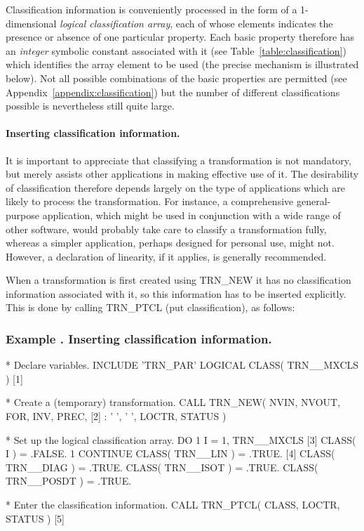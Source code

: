 \documentclass[twoside,nolof,11pt]{starlink}
\providecommand{\name}[1]{\small{#1}}
\newcounter{examplecounter}
\providecommand{\example}[1]{\addtocounter{examplecounter}{1}
                         \subsubsection*{Example \theexamplecounter. #1}}
\begin{document}
Classification information is conveniently processed in the form of a
1-dimensional \emph{logical classification array}, each of whose elements
indicates the presence or absence of one particular property.
Each basic property therefore has an \emph{integer} symbolic constant
associated with it (see Table~\ref{table:classification}) which identifies
the array element to be used (the precise mechanism is illustrated below).
Not all possible combinations of the basic properties are permitted (see
Appendix~\ref{appendix:classification}) but the number of different
classifications possible is nevertheless still quite large.

\paragraph{Inserting classification information.}
It is important to appreciate that classifying a transformation is not
mandatory, but merely assists other applications in making effective
use of it.
The desirability of classification therefore depends largely on the type of
applications which are likely to process the transformation.
For instance, a comprehensive general-purpose application, which might be
used in conjunction with a wide range of other software, would probably take
care to classify a transformation fully, whereas a simpler application,
perhaps designed for personal use, might not.
However, a declaration of linearity, if it applies, is generally
recommended.

When a transformation is first created using \name{TRN\_NEW} it has no
classification information associated with it, so this information has to be
inserted explicitly.
This is done by calling \name{TRN\_PTCL} (put classification), as follows:

\example{Inserting classification information.}

\begin{terminalv}

*  Declare variables.
      INCLUDE 'TRN_PAR'
      LOGICAL CLASS( TRN__MXCLS )                      [1]

*  Create a (temporary) transformation.
      CALL TRN_NEW( NVIN, NVOUT, FOR, INV, PREC,       [2]
     :              ' ', ' ', LOCTR, STATUS )

*  Set up the logical classification array.
      DO 1 I = 1, TRN__MXCLS                           [3]
         CLASS( I ) = .FALSE.
    1 CONTINUE
      CLASS( TRN__LIN ) = .TRUE.                       [4]
      CLASS( TRN__DIAG ) = .TRUE.
      CLASS( TRN__ISOT ) = .TRUE.
      CLASS( TRN__POSDT ) = .TRUE.

*  Enter the classification information.
      CALL TRN_PTCL( CLASS, LOCTR, STATUS )            [5]

\end{terminalv}
\end{document}
